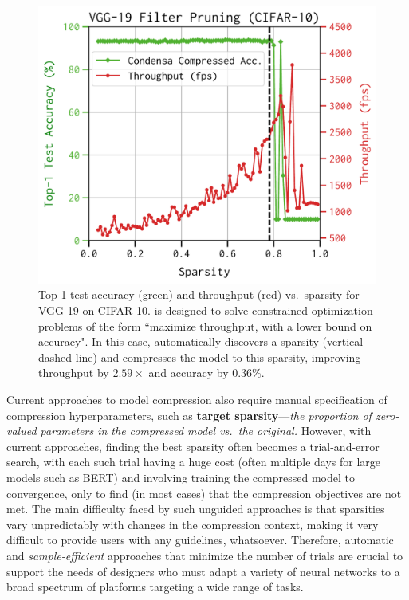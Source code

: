 \begin{refsection}
\begin{figure}[!h]
\centering
\includegraphics[width=0.5\linewidth]{img/vgg19_bn_filter_intro_v2.pdf}
\caption{Top-1 test accuracy (green) and throughput (red) vs.\ sparsity for VGG-19 on CIFAR-10.
\algoName is designed to solve constrained optimization problems of the form ``maximize throughput, with a lower bound on accuracy". In this case, \algoName automatically discovers a sparsity (vertical dashed line) and compresses the model to this sparsity,
improving throughput by $2.59\times$ and accuracy by $0.36\%$.
}
\vspace{-10pt}
\label{fig:vgg-intro}
\end{figure}

%
Current approaches to model compression
also require manual specification of compression hyperparameters, such
as {\bf target sparsity}---{\em the proportion of zero-valued parameters in the
compressed model vs.\ the original.}
%
However, with current approaches, finding the best sparsity 
often becomes a trial-and-error search, with
each such trial having a huge cost (often multiple days for large models such as BERT) and involving training the compressed model to convergence,
only to find (in most cases) that the compression objectives are not met.
%
The main difficulty faced by such unguided approaches is
that sparsities 
vary unpredictably with changes in the compression context,
making it very difficult to provide users with any guidelines, whatsoever.
%
Therefore, automatic and {\em sample-efficient} approaches that minimize the number of trials are crucial
to support the needs of designers who must adapt
a variety of neural networks to a broad spectrum of platforms targeting a wide
range of tasks.


\end{refsection}
